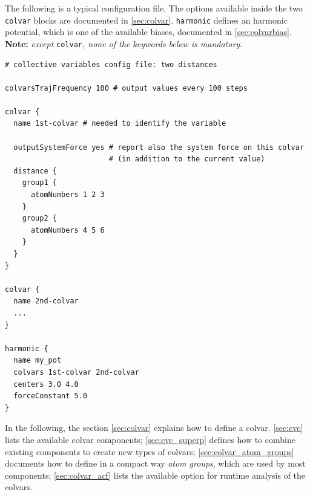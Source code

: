 \begin{itemize}


\end{itemize}

The following is a typical configuration file.  The options available
inside the two \texttt{colvar} blocks are documented in
\ref{sec:colvar}.  \texttt{harmonic} defines an harmonic potential,
which is one of the available biases, documented in
\ref{sec:colvarbias}.  \textbf{Note:} \emph{except
}\texttt{colvar}\emph{, none of the keywords below is mandatory}.
\begin{verbatim}
# collective variables config file: two distances

colvarsTrajFrequency 100 # output values every 100 steps

colvar {
  name 1st-colvar # needed to identify the variable

  outputSystemForce yes # report also the system force on this colvar
                        # (in addition to the current value)
  distance {
    group1 {
      atomNumbers 1 2 3 
    }
    group2 {
      atomNumbers 4 5 6 
    }
  }
}

colvar {
  name 2nd-colvar
  ...
}

harmonic {
  name my_pot
  colvars 1st-colvar 2nd-colvar
  centers 3.0 4.0
  forceConstant 5.0
}
\end{verbatim}

In the following, the section \ref{sec:colvar} explains how to define
a colvar.  \ref{sec:cvc} lists the available colvar components;
\ref{sec:cvc_superp} defines how to combine existing components to
create new types of colvars; \ref{sec:colvar_atom_groups} documents
how to define in a compact way \emph{atom groups}, which are used by
most components; \ref{sec:colvar_acf} lists the available option for
runtime analysis of the colvars.

